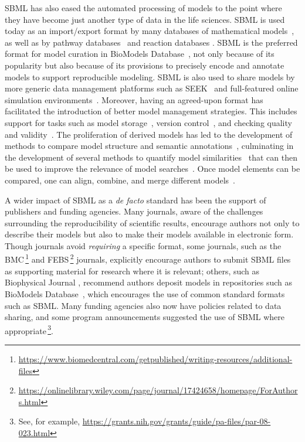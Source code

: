 \documentclass{sbml-paper}
\begin{document}
SBML has also eased the automated processing of models to the point where they have become just another type of data in the life sciences.  SBML is used today as an import/export format by many databases of mathematical models~\citep{chelliah2014biomodels, Norsigian2019, Misirli2014composable}, as well as by pathway databases~\citep{caspi2015metacyc, mi_2016, fabregat2017reactome} and reaction databases \citep{ganter2013metanetx, wittig2017sabio}.  SBML is the preferred format for model curation in BioModels Database~\citep{chelliah2009data}, not only because of its popularity but also because of its provisions to precisely encode and annotate models to support reproducible modeling.  SBML is also used to share models by more generic data management platforms such as SEEK~\citep{wolstencroft2016fairdomhub, stanford2019data} and full-featured online simulation environments~\citep[e.g.,][]{Moraru2008virtual, Safranek2011ephotosynthesis, peters2017jws, Weidemann2008sycamore, Lee2009webbased}.  Moreover, having an agreed-upon format has facilitated the introduction of better model management strategies.  This includes support for tasks such as model storage~\citep{Henkel2015combininga}, version control~\citep{Scharm2016algorithm}, and checking quality and validity~\citep{Liebermeister2008validity}.  The proliferation of derived models has led to the development of methods to compare model structure and semantic annotations~\citep{Lambusch2018identifying}, culminating in the development of several methods to quantify model similarities~\citep{henkel2016notions} that can then be used to improve the relevance of model searches~\citep{schulz2011retrieval,henkel2010ranked}.  Once model elements can be compared, one can align, combine, and merge different models~\citep{krause2010annotation}.
 
A wider impact of SBML as a \emph{de facto} standard has been the support of publishers and funding agencies.  Many journals, aware of the challenges surrounding the reproducibility of scientific results, encourage authors not only to describe their models but also to make their models available in electronic form.  Though journals avoid \emph{requiring} a specific format, some journals, such as the BMC$\,$\footnote{\url{https://www.biomedcentral.com/getpublished/writing-resources/additional-files}} and FEBS$\,$\footnote{\url{https://onlinelibrary.wiley.com/page/journal/17424658/homepage/ForAuthors.html}} journals, explicitly encourage authors to submit SBML files as supporting material for research where it is relevant; others, such as Biophysical Journal \citep{nickerson2017introducing}, recommend authors deposit models in repositories such as BioModels Database~\citep{chelliah2014biomodels}, which encourages the use of common standard formats such as SBML.  Many funding agencies also now have policies related to data sharing, and some program announcements suggested the use of SBML where appropriate$\,$\footnote{See, for example, \url{https://grants.nih.gov/grants/guide/pa-files/par-08-023.html}}.
\end{document}

